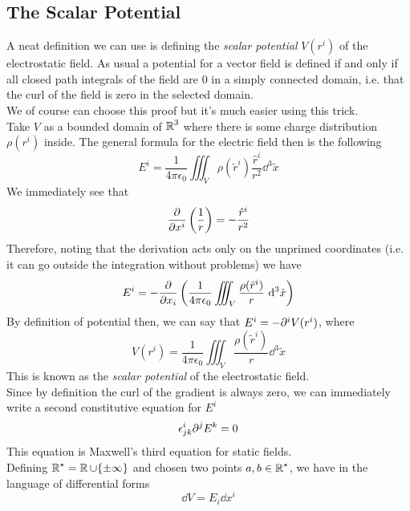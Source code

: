 \documentclass[../electromagnetism]{subfiles}
\begin{document}
\subsection{The Scalar Potential}
A neat definition we can use is defining the \textit{scalar potential} $V(r^i)$ of the electrostatic field. As usual a potential for a vector field is defined if and only if all closed path integrals of the field are $0$ in a simply connected domain, i.e. that the curl of the field is zero in the selected domain.\\
We of course can choose this proof but it's much easier using this trick.\\
Take $V$ as a bounded domain of $\operatorname{\mathbb{R}}^3$ where there is some charge distribution $\rho(r^i)$ inside. The general formula for the electric field then is the following
\begin{equation}
	E^i=\frac{1}{4\pi\epsilon_0}\iiint_{V}^{}\rho(\tilde{r}^i)\frac{\hat{r}^i}{r^2}\dd^3\tilde{x}
	\label{eq:efieldpot}
\end{equation}
We immediately see that
\begin{equation*}
	\pdv{x^i}\left( \frac{1}{r} \right)=-\frac{\hat{r}^i}{r^2}
\end{equation*}
Therefore, noting that the derivation acts only on the unprimed coordinates (i.e. it can go outside the integration without problems) we have
\begin{equation}
	E^i=-\pdv{x_i}\left( \frac{1}{4\pi\epsilon_0}\iiint_V\frac{\rho(\tilde{r}^i)}{r}\ \mathrm{d}^3\tilde{x} \right)
	\label{eq:trick}
\end{equation}
By definition of potential then, we can say that $E^i=-\partial^i V(r^i)$, where
\begin{equation}
	V(r^i)=\frac{1}{4\pi\epsilon_0}\iiint_V\frac{\rho(\tilde{r}^i)}{r}\dd^3\tilde{x}
	\label{eq:scalarpot}
\end{equation}
This is known as the \textit{scalar potential} of the electrostatic field.\\
Since by definition the curl of the gradient is always zero, we can immediately write a second constitutive equation for $E^i$
\begin{equation}
	\epsilon^i_{jk}\partial^jE^k=0
	\label{eq:3rdmaxwell}
\end{equation}
This equation is Maxwell's third equation for static fields.\\
Defining $\operatorname{\mathbb{R}}^\star=\operatorname{\mathbb{R}}\cup\{\pm\infty\}$ and chosen two points $a,b\in\operatorname{\mathbb{R}}^\star$, we have in the language of differential forms
\begin{equation}
	\dd V=E_i\dd x^i
	\label{eq:extder}
\end{equation}
\end{document}
